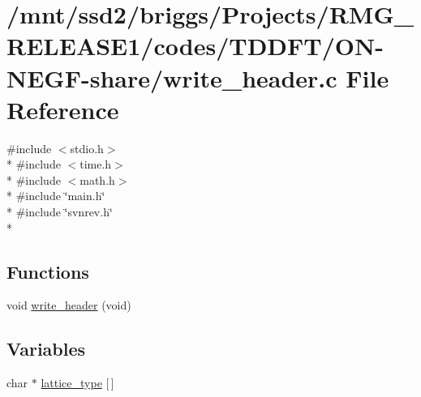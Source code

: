 \hypertarget{_t_d_d_f_t_2_o_n-_n_e_g_f-share_2write__header_8c}{\section{/mnt/ssd2/briggs/\-Projects/\-R\-M\-G\-\_\-\-R\-E\-L\-E\-A\-S\-E1/codes/\-T\-D\-D\-F\-T/\-O\-N-\/\-N\-E\-G\-F-\/share/write\-\_\-header.c File Reference}
\label{_t_d_d_f_t_2_o_n-_n_e_g_f-share_2write__header_8c}
}
{\ttfamily \#include $<$stdio.\-h$>$}\\*
{\ttfamily \#include $<$time.\-h$>$}\\*
{\ttfamily \#include $<$math.\-h$>$}\\*
{\ttfamily \#include \char`\"{}main.\-h\char`\"{}}\\*
{\ttfamily \#include \char`\"{}svnrev.\-h\char`\"{}}\\*
\subsection*{Functions}
\begin{DoxyCompactItemize}
\item 
void \hyperlink{_t_d_d_f_t_2_o_n-_n_e_g_f-share_2write__header_8c_aa87a0aba67f32b1021d78edfb043ec71}{write\-\_\-header} (void)
\end{DoxyCompactItemize}
\subsection*{Variables}
\begin{DoxyCompactItemize}
\item 
char $\ast$ \hyperlink{_t_d_d_f_t_2_o_n-_n_e_g_f-share_2write__header_8c_a1b9ed72e036c63a5df3fbac5f015f6bc}{lattice\-\_\-type} \mbox{[}$\,$\mbox{]}
\end{DoxyCompactItemize}


